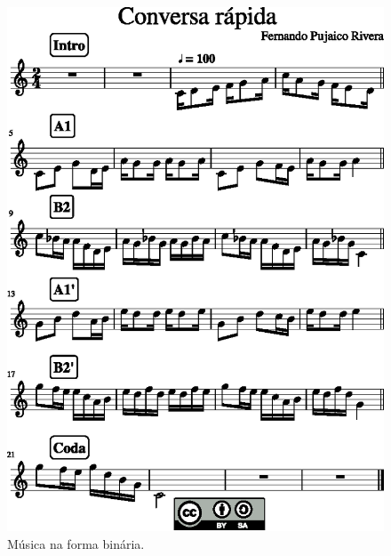 \newpage
     \begin{figure}[!ht]
	     \centering
	     \includegraphics[width=1.0\textwidth]{chapters/cap-musica-topicos/section-cancao-1.eps}
	     \caption{Música na forma binária.}
	     \label{fig:section-cancao}
     \end{figure}

